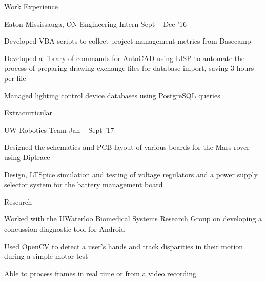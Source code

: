\documentclass{resume} %
\begin{document}
\begin{rSection}{Work Experience}
		\begin{rSubsection}{Eaton}
			{Mississauga, ON}
			{Engineering Intern}
			{Sept -- Dec '16}
			
			\item Developed VBA scripts to collect project management metrics from Basecamp
			\item Developed a library of commands for AutoCAD using LISP to automate the process of preparing drawing exchange files for database import, saving 3 hours per file
			\item Managed lighting control device databases using PostgreSQL queries
		\end{rSubsection}
		
	\end{rSection}

	
	\begin{rSection}{Extracurricular}
	
		\begin{rSubsection}{UW Robotics Team}
			{}
			{}
			{Jan -- Sept '17}

			\item Designed the schematics and PCB layout of various boards for the Mars rover using Diptrace
			\item Design, LTSpice simulation and testing of voltage regulators and a power supply selector system for the battery management board

		\end{rSubsection}

		\begin{rSubsection}{Research}			
			{}
			{}
			{}

			\item Worked with the UWaterloo Biomedical Systems Research Group on developing a concussion diagnostic tool for Android
            \item Used OpenCV to detect a user's hands and track disparities in their motion during a simple motor test
            \item Able to process frames in real time or from a video recording
		\end{rSubsection}	
	\end{rSection}
\end{document}
